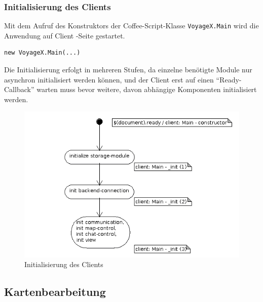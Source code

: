 \subsubsection{Initialisierung des Clients}
Mit dem Aufruf des Konstruktors der Coffee-Script-Klasse \texttt{VoyageX.Main} wird die Anwendung auf Client -Seite gestartet.   
\lstset{language=JavaScript}
\begin{lstlisting}[frame=single,xleftmargin=0pt,numbers=none,label={lst:CL_ClientInit}]
new VoyageX.Main(...) 
\end{lstlisting}
Die Initialisierung erfolgt in mehreren Stufen, da einzelne benötigte Module nur asynchron initialisiert werden können, und der Client erst auf einen "`Ready-Callback"' warten muss bevor weitere, davon abhängige Komponenten initialisiert werden. 
  \begin{figure}[H]
      \centering
	  \includegraphics[scale=0.5]{bilder/uml/initClient.png}
  	  \caption{Initialisierung des Clients}
  	  \label{fig:CLIENT_INIT}
  \end{figure}
\subsection{Kartenbearbeitung}\label{5_KARBE}

